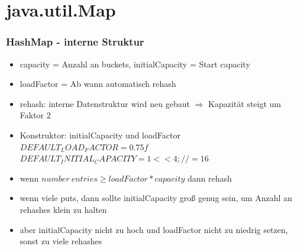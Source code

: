 \section{java.util.Map}




\begin{frame}[fragile]
\frametitle{HashMap - interne Struktur}
\begin{itemize}[<+->]
  \item capacity = Anzahl an buckets, initialCapacity = Start capacity
  \item loadFactor = Ab wann automatisch rehash
  \item rehash: interne Datenstruktur wird neu gebaut $\Rightarrow$ Kapazität steigt um Faktor 2
  \item Konstruktor: initialCapacity und loadFactor \\
	$DEFAULT_LOAD_FACTOR = 0.75f$ \\
	$DEFAULT_INITIAL_CAPACITY = 1 << 4; // = 16$
  \item wenn $number\ entries \geq loadFactor * capacity$ dann rehash
  \item wenn viele puts, dann sollte initialCapacity groß genug sein, um Anzahl an rehashes klein zu halten
  \item aber initialCapacity nicht zu hoch und loadFactor nicht zu niedrig setzen, sonst zu viele rehashes
\end{itemize}
\end{frame}


